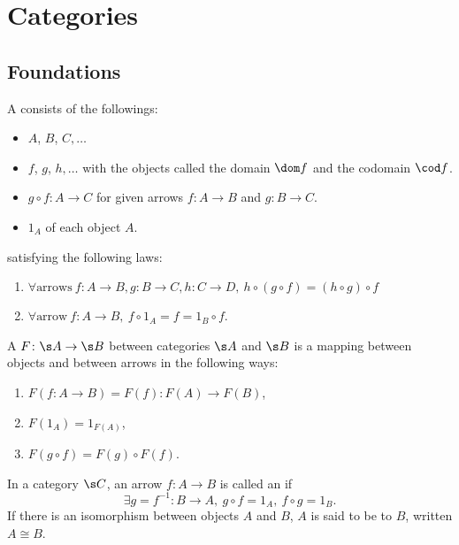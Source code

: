 \newcommand{\sets}{\mathbf{Sets}}
\newcommand{\op}[1]{{#1}^{\mathrm{op}}}
\newcommand{\arr}[1]{{#1}^{\rightarrow}}
\section{Categories\cite{awodey}}
\subsection{Foundations}
A  consists of the followings:
\begin{itemize}
\item {} $A$, $B$, $C, \dotsc$
\item {} $f$, $g$, $h, \dotsc$ with the objects called the domain $\dom f$ and the codomain $\cod f$.
\item {} $g \circ f \colon A \to C$ for given arrows $f \colon A \to B$ and $g \colon B \to C$.
\item {} $1_A$ of each object $A$.
\end{itemize}
satisfying the following laws:
\begin{enumerate}
\item $\forall \text{arrows}\ f \colon A \to B, g \colon B \to C, h \colon C \to D,\ h \circ (g \circ f) = (h \circ g) \circ f$
\item $\forall \text{arrow}\ f \colon A \to B,\ f \circ 1_A = f = 1_B \circ f$.
\end{enumerate}

A  $F\colon \s A \to \s B$ between categories $\s A$ and $\s B$ is a mapping between objects and between arrows in the following ways:
\begin{enumerate}
\item $F(f\colon A \to B) = F(f) \colon F(A) \to F(B)$,
\item $F(1_A) = 1_{F(A)}$,
\item $F(g \circ f) = F(g) \circ F(f)$.
\end{enumerate}

In a category $\s C$, an arrow $f \colon A \to B$ is called an  if
\[
\exists g = f^{-1} \colon B \to A,\ g \circ f = 1_A,\ f \circ g = 1_B.
\]
If there is an isomorphism between objects $A$ and $B$, $A$ is said to be  to $B$, written $A \cong B$.


